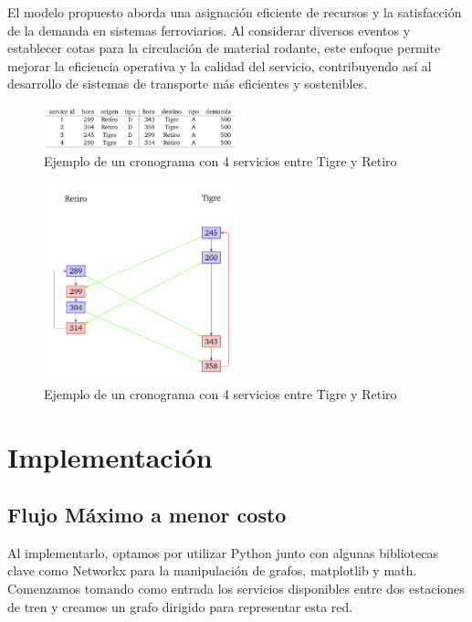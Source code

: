 \documentclass{article}
\begin{document}
    El modelo propuesto aborda una asignación eficiente de recursos y la satisfacción de la demanda en sistemas ferroviarios. Al considerar diversos eventos y establecer cotas para la circulación de material rodante, este enfoque permite mejorar la eficiencia operativa y la calidad del servicio, contribuyendo así al desarrollo de sistemas de transporte más eficientes y sostenibles.

    
     

\begin{figure}[htbp]
    \centering
    \includegraphics[width=0.5\textwidth]{imagenhorarios.png}
    \caption{Ejemplo de un cronograma con 4 servicios entre Tigre y Retiro}
    \label{fig:ejemplo}
\end{figure}

\begin{figure}[htbp]
    \centering
    \includegraphics[width=0.5\textwidth]{grafo.png}
    \caption{Ejemplo de un cronograma con 4 servicios entre Tigre y Retiro}
    \label{fig:ejemplo}
\end{figure}

    \section{Implementación}
    \vspace{0.5cm}
    \subsection{Flujo Máximo a menor costo}
        
    Al implementarlo, optamos por utilizar Python junto con algunas bibliotecas clave como Networkx para la manipulación de grafos, matplotlib y math. Comenzamos tomando como entrada los servicios disponibles entre dos estaciones de tren y creamos un grafo dirigido para representar esta red.
    
\end{document}
